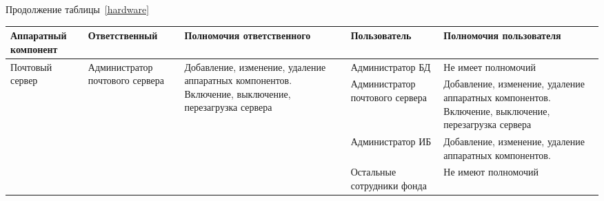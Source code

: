 \begin{sidewaystable}[h]
  Продолжение таблицы~\ref{hardware}
  \begin{longtable}{|p{3cm}|p{3.5cm}|
      p{3cm}|p{5cm}|p{8cm}|}
\hline 
Аппаратный компонент & Ответствен\-ный & Полномочия ответственного  &
Пользователь & Полномочия пользователя\\\hline

\multirow{10}{3cm}{Почтовый сервер} 
&\multirow{10}{3.5cm}{Администратор почтового сервера} 
&\multirow{8}{4.5cm}{Добавление, изменение, удаление аппаратных компонентов.
Включение, выключение, перезагрузка сервера}
&Администратор БД
&Не имеет полномочий\\\cline{4-5}
&&&Администратор почтового сервера
&Добавление, изменение, удаление аппаратных компонентов.
Включение, выключение, перезагрузка сервера\\\cline{4-5}
&&&Администратор ИБ
&Добавление, изменение, удаление аппаратных компонентов.\\\cline{4-5}
&&&Остальные сотрудники фонда
&Не имеют полномочий\\ \hline
\end{longtable}
\end{sidewaystable}


